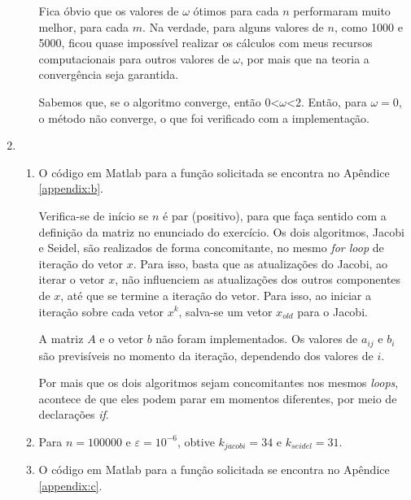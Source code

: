 \documentclass{article}
\begin{document}
\begin{enumerate}
\begin{enumerate}
                    Fica óbvio que os valores de $\omega$ ótimos para cada $n$ performaram muito melhor, para cada $m$.
                    Na verdade, para alguns valores de $n$, como 1000 e 5000, ficou quase impossível realizar os cálculos com meus recursos computacionais para outros valores de $\omega$,
                    por mais que na teoria a convergência seja garantida.
                    
                    Sabemos que, se o algoritmo converge, então 0<$\omega$<2. Então, para $\omega=0$, o
                    método não converge, o que foi verificado com a implementação.
                    
            \end{enumerate}
            
        \item \begin{enumerate}
                \item O código em Matlab para a função solicitada se encontra no Apêndice \ref{appendix:b}.
                
                    Verifica-se de início se $n$ é par (positivo), para que faça sentido com a definição da matriz
                    no enunciado do exercício. Os dois algoritmos, Jacobi e Seidel, são realizados de forma concomitante,
                    no mesmo \textit{for loop} de iteração do vetor $x$. Para isso, basta que as atualizações do Jacobi, ao iterar o vetor $x$, não influenciem as atualizações
                    dos outros componentes de $x$, até que se termine a iteração do vetor. Para isso, ao iniciar a iteração sobre cada vetor $x^{k}$, salva-se um vetor
                    $x_{old}$ para o Jacobi.

                    A matriz $A$ e o vetor $b$ não foram implementados. Os valores de $a_{ij}$ e $b_i$ são previsíveis no momento
                    da iteração, dependendo dos valores de $i$.

                    Por mais que os dois algoritmos sejam concomitantes nos mesmos \textit{loops}, acontece de que eles podem parar em momentos diferentes,
                    por meio de declarações \textit{if}.

                \item Para $n=100000$ e $\varepsilon=10^{-6}$, obtive $k_{jacobi}=34$ e $k_{seidel}=31$.
                
                \item O código em Matlab para a função solicitada se encontra
                    no Apêndice \ref{appendix:c}.


\end{enumerate}
\end{enumerate}
\end{document}

